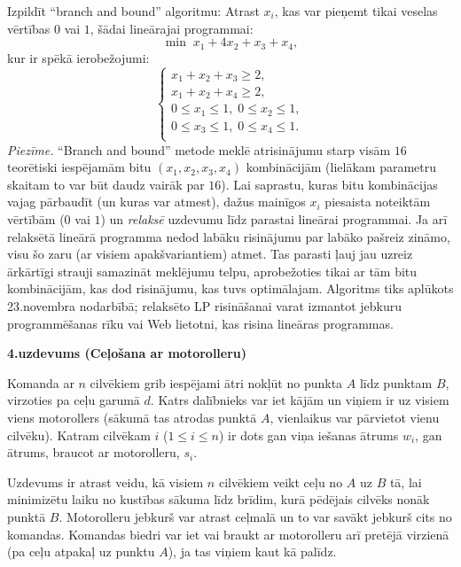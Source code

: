 \documentclass[a4paper]{article}
\begin{document}
Izpildīt ``branch and bound'' algoritmu: Atrast $x_i$, 
kas var pieņemt tikai veselas vērtības $0$ vai $1$, šādai lineārajai
programmai:
$$\min\;x_1 + 4x_2 + x_3 + x_4,$$
kur ir spēkā ierobežojumi: 
$$\left\{ \begin{array}{l} 
x_1 + x_2 + x_3 \geq 2,\\
x_1 + x_2 + x_4 \geq 2,\\
0 \leq x_1 \leq 1,\; 0 \leq x_2 \leq 1,\\
0 \leq x_3 \leq 1,\;0 \leq x_4 \leq 1.\\
\end{array} \right.$$
{\footnotesize
{\em Piezīme.} ``Branch and bound'' metode meklē atrisinājumu 
starp visām $16$ teorētiski iespējamām bitu $(x_1,x_2,x_3,x_4)$ 
kombinācijām (lielākam parametru skaitam to var būt daudz vairāk par $16$). 
Lai saprastu, kuras bitu kombinācijas vajag pārbaudīt (un kuras var atmest), 
dažus mainīgos $x_i$ piesaista noteiktām vērtībām ($0$ vai $1$) un 
{\em relaksē} uzdevumu līdz parastai lineārai programmai. 
Ja arī relaksētā lineārā programma nedod labāku risinājumu par labāko pašreiz zināmo, 
visu šo zaru (ar visiem apakšvariantiem) atmet. 
Tas parasti ļauj jau uzreiz ārkārtīgi strauji samazināt meklējumu telpu, 
aprobežoties tikai ar tām bitu kombinācijām, kas dod risinājumu, kas tuvs optimālajam. 
Algoritms tiks aplūkots 23.novembra nodarbībā; relaksēto LP risināšanai varat izmantot
jebkuru programmēšanas rīku vai Web lietotni, kas risina lineāras programmas.
}

 







\vspace{20pt}
{\bf 4.uzdevums (Ceļošana ar motorolleru)}

Komanda ar $n$ cilvēkiem grib iespējami 
ātri no\-kļūt no punkta $A$ līdz punktam $B$, 
virzoties pa ceļu garumā $d$. 
Katrs dalībnieks var iet kājām un viņiem ir uz visiem 
viens motorollers (sākumā tas atrodas punktā $A$,  
vienlaikus var pārvietot vienu cilvēku). 
Katram cilvēkam $i$ ($1 \leq i \leq n$) 
ir dots gan viņa iešanas ātrums $w_i$, 
gan ātrums, braucot ar motorolleru, $s_i$.

Uzdevums ir atrast veidu, kā visiem $n$ cilvēkiem veikt ceļu
no $A$ uz $B$ tā, lai minimizētu laiku no kustības sākuma 
līdz brīdim, kurā pēdējais cilvēks nonāk punktā $B$. 
Motorolleru jebkurš var 
atrast ceļmalā un to var savākt jebkurš cits no komandas. 
Komandas biedri var iet vai braukt ar 
motorolleru arī pretējā virzienā (pa ceļu 
atpakaļ uz punktu $A$), ja tas viņiem kaut kā palīdz.
\end{document}
